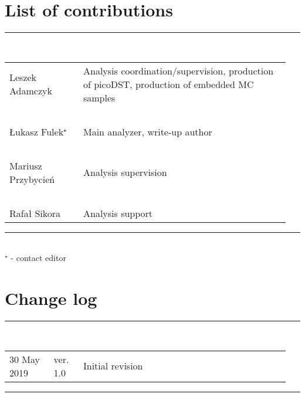 \section*{\LARGE List of contributions}%
%
   \rule{\textwidth}{1.0pt}\\[5pt]%
      \begin{tabular}{>{\raggedright}p{0.25\linewidth}p{0.7\linewidth}}
		Leszek Adamczyk & Analysis coordination/supervision, production of picoDST, production of embedded MC samples\\
		~&~\\
		Łukasz Fulek$^{\star}$  & Main analyzer, write-up author\\
		~&~\\
		Mariusz Przybycień & Analysis supervision\\
		~&~\\
        Rafał Sikora & Analysis support\\
      \end{tabular}\newline
   \rule{\textwidth}{1.0pt}\\[10pt]%
   $^{\star}$ - contact editor
   \\[50pt]%
\section*{\LARGE Change log}%
%
  \rule{\textwidth}{1.0pt}\\[5pt]%
  \begin{tabular}{>{\raggedright}p{0.15\linewidth}p{0.1\linewidth}p{0.7\linewidth}}
  	30 May 2019 & ver. 1.0 & Initial revision
  \end{tabular}\newline%
 \rule{\textwidth}{1.0pt}